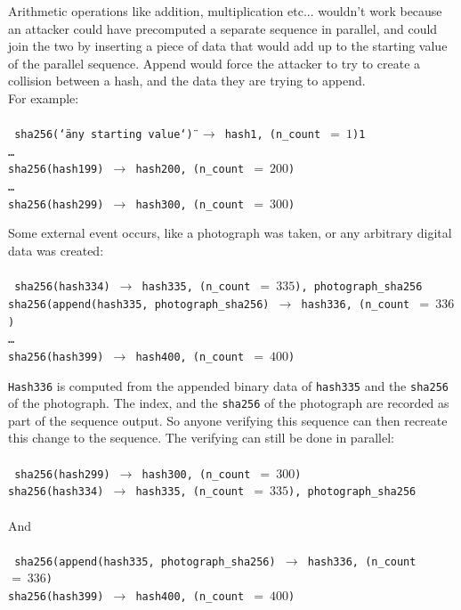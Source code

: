\documentclass[12pt]{article}
\begin{document}
Arithmetic operations like addition, multiplication etc... wouldn’t work because an attacker could have precomputed a separate sequence in parallel, and could join the two by inserting a piece of data that would add up to the starting value of the parallel sequence. Append would force the attacker to try to create a collision between a hash, and the data they are trying to append.\\


\noindent For example:\\\\\noindent
\texttt{
sha256(\char`\"any starting value\char`\") $\rightarrow$ hash1,
(n\_count $=~1$)1\\
\ldots\\
sha256(hash199) $\rightarrow$ hash200, (n\_count $=~200$)\\
\ldots\\
sha256(hash299) $\rightarrow$ hash300, (n\_count $=~300$)\\
}

\noindent Some external event occurs, like a photograph was taken, or
any arbitrary digital data was created:\\\\\noindent
\texttt{
  sha256(hash334) $\rightarrow$ hash335, (n\_count $=~335$), photograph\_sha256\\
  sha256(append(hash335, photograph\_sha256) $\rightarrow$ hash336,
  (n\_count $=~336$)\\
  \ldots\\
  sha256(hash399) $\rightarrow$ hash400, (n\_count $=~400$)\\
}

\texttt{Hash336} is computed from the appended binary data of
\texttt{hash335} and the \texttt{sha256} of the photograph. The index,
and the \texttt{sha256} of the photograph are recorded as part of the
sequence output. So anyone verifying this sequence can then recreate
this change to the sequence. The verifying can still be done in
parallel:\\\\\noindent
\texttt{
  sha256(hash299) $\rightarrow$ hash300, (n\_count $=~300$)\\
  sha256(hash334) $\rightarrow$ hash335, (n\_count $=~335$), photograph\_sha256\\
}\\\noindent
And\\\\\noindent
\texttt{
  sha256(append(hash335, photograph\_sha256) $\rightarrow$ hash336,
  (n\_count $=~336$)\\
  sha256(hash399) $\rightarrow$ hash400, (n\_count $=~400$)\\
}
\end{document}
